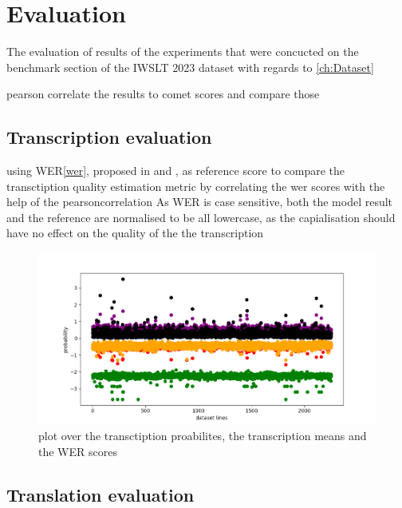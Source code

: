 
\chapter{Evaluation}
\label{ch:Evaluation}
The evaluation of results of the experiments that were concucted on the benchmark section of the IWSLT 2023 dataset \cite{sperber2024evaluating} with regards to \ref{ch:Dataset}

pearson correlate \cite{2020SciPy-NMeth} the results to comet scores and compare those 


\section{Transcription evaluation}

using WER\ref{wer}, proposed in \cite{woodard1982} and \cite{morris2004}, as reference score to compare the transctiption quality estimation metric by correlating the wer scores with the help of the pearsoncorrelation \cite{2020SciPy-NMeth}
As WER is case sensitive, both the model result and the reference are normalised to be all lowercase, as the capialisation should have no effect on the quality of the the transcription
\begin{figure}
    \centering
    \includegraphics[width=0.5\linewidth]{Latex/sections/images/dlm plot.png}
    \caption{plot over the transctiption proabilites, the transcription means and the WER scores}
    \label{fig:transcript scatter plot}
\end{figure}

\section{Translation evaluation}

